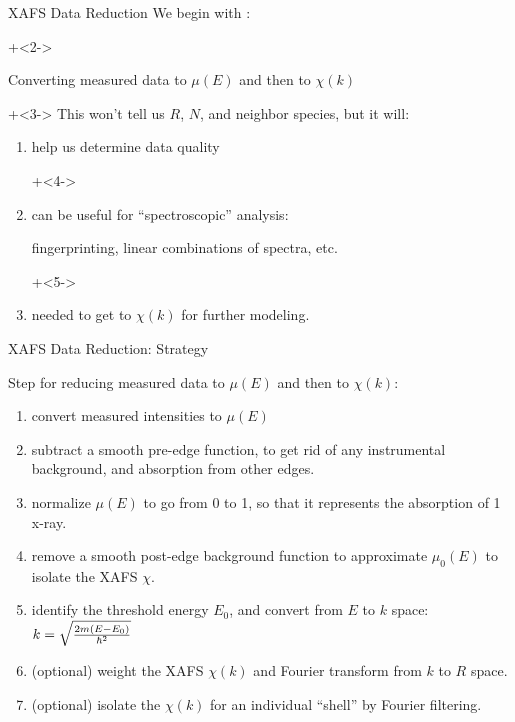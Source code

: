 
\begin{slide}{XAFS Data Reduction}
  We begin with {}:

  \onslide+<2->
  \begin{center}
    Converting measured data to ${\mu(E)}$ and then to ${\chi(k)}$
  \end{center}
  
  \vmm
  \onslide+<3->
  This won't tell us $R$, $N$, and neighbor species, but it will:
  
  \vmm
  \begin{enumerate}
  \item help us determine data quality
    
    \onslide+<4->
  \item can be useful for ``spectroscopic'' analysis: \par fingerprinting,
    linear combinations of spectra, etc.

    \onslide+<5->
  \item needed to get to ${\chi(k)}$ for further modeling.
  \end{enumerate}

  \vmm \vfill
\end{slide}

\begin{slide}{XAFS Data Reduction: Strategy}

  Step for reducing measured data to ${\mu(E)}$ and then to ${\chi(k)}$:

  \begin{enumerate}
  \item convert measured intensities to ${\mu(E)}$
    \pause
  \item subtract a smooth pre-edge function, to get rid of any instrumental
    background, and absorption from other edges. 
    \pause
  \item normalize ${\mu(E)}$ to go from 0 to 1, so that it represents the
    absorption of 1 x-ray.
    \pause
  \item remove a smooth post-edge background function to approximate
    ${\mu_0(E)}$ to isolate the XAFS ${\chi}$.
    \pause
  \item identify the threshold energy ${E_0}$, and convert from
    ${E}$ to ${k}$ space: ${ k=
      \sqrt{{{2m(E-E_0)}\over{\hbar^2}}} }$
    \pause
  \item (optional) weight the XAFS ${\chi(k)}$ and Fourier transform from
    ${k}$ to ${R}$ space.
    \pause
  \item  (optional) isolate the ${\chi(k)}$ for an individual
  ``shell''  by Fourier filtering.
  \end{enumerate}


  \vmm


\vfill
\end{slide} 
